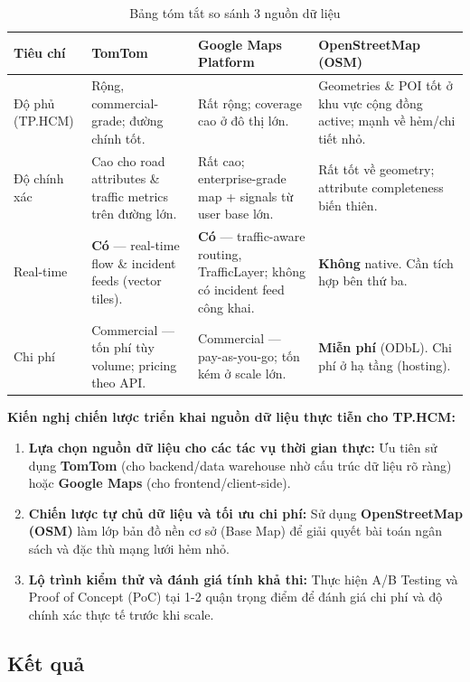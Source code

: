 \begin{table}[H]
\centering
\caption{Bảng tóm tắt so sánh 3 nguồn dữ liệu}
\begin{tabular}{|p{3cm}|p{4cm}|p{4cm}|p{4cm}|}
\hline
\textbf{Tiêu chí} & \textbf{TomTom} & \textbf{Google Maps Platform} & \textbf{OpenStreetMap (OSM)} \\ \hline
Độ phủ (TP.HCM) & Rộng, commercial-grade; đường chính tốt. & Rất rộng; coverage cao ở đô thị lớn. & Geometries \& POI tốt ở khu vực cộng đồng active; mạnh về hẻm/chi tiết nhỏ. \\ \hline
Độ chính xác & Cao cho road attributes \& traffic metrics trên đường lớn. & Rất cao; enterprise-grade map + signals từ user base lớn. & Rất tốt về geometry; attribute completeness biến thiên. \\ \hline
Real-time & \textbf{Có} — real-time flow \& incident feeds (vector tiles). & \textbf{Có} — traffic-aware routing, TrafficLayer; không có incident feed công khai. & \textbf{Không} native. Cần tích hợp bên thứ ba. \\ \hline
Chi phí & Commercial — tốn phí tùy volume; pricing theo API. & Commercial — pay-as-you-go; tốn kém ở scale lớn. & \textbf{Miễn phí} (ODbL). Chi phí ở hạ tầng (hosting). \\ \hline
\end{tabular}
\end{table}

\textbf{Kiến nghị chiến lược triển khai nguồn dữ liệu thực tiễn cho TP.HCM:}
\begin{enumerate}
    \item \textbf{Lựa chọn nguồn dữ liệu cho các tác vụ thời gian thực:} Ưu tiên sử dụng \textbf{TomTom} (cho backend/data warehouse nhờ cấu trúc dữ liệu rõ ràng) hoặc \textbf{Google Maps} (cho frontend/client-side).
    \item \textbf{Chiến lược tự chủ dữ liệu và tối ưu chi phí:} Sử dụng \textbf{OpenStreetMap (OSM)} làm lớp bản đồ nền cơ sở (Base Map) để giải quyết bài toán ngân sách và đặc thù mạng lưới hẻm nhỏ.
    \item \textbf{Lộ trình kiểm thử và đánh giá tính khả thi:} Thực hiện A/B Testing và Proof of Concept (PoC) tại 1-2 quận trọng điểm để đánh giá chi phí và độ chính xác thực tế trước khi scale.
\end{enumerate}

\subsection{Kết quả}
